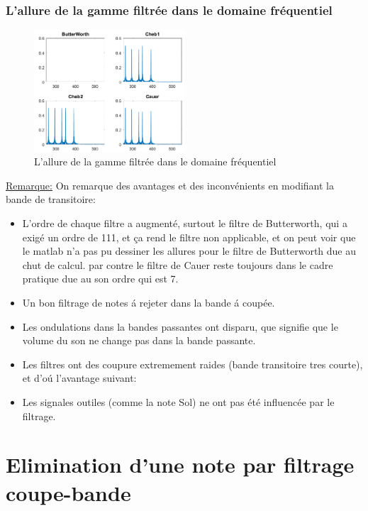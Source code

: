 \documentclass[twoside,twocolumn]{article}
\begin{document}
\subsubsection{L'allure de la gamme filtrée dans le domaine fréquentiel}
\begin{figure}[H]
\centering
\includegraphics[width=0.5\textwidth]{Images/11.png}
\caption{ L'allure de la gamme filtrée dans le domaine fréquentiel}
\end{figure}

\underline{Remarque:}
On remarque des avantages et des inconvénients en modifiant la bande de transitoire:
\begin{itemize}

\item
L'ordre de chaque filtre a augmenté, surtout le filtre de Butterworth, qui a exigé un ordre de 111, et ça rend le filtre non applicable, et on peut voir que le matlab n'a pas pu dessiner les allures pour le filtre de Butterworth due au chut de calcul. par contre le filtre de Cauer reste toujours dans le cadre pratique due au son ordre qui est 7.

\item
Un bon filtrage de notes á rejeter dans la bande á coupée.

\item
Les ondulations dans la bandes passantes ont disparu, que signifie que le volume du son ne change pas dans la bande passante.
\item
Les filtres ont des coupure extremement raides (bande transitoire tres courte), et d'oú l'avantage suivant:

\item
Les signales outiles (comme la note Sol) ne ont pas été influencée par le filtrage.

\end{itemize}
\newpage
\newpage

\section{Elimination d’une note par filtrage coupe-bande}
\end{document}
